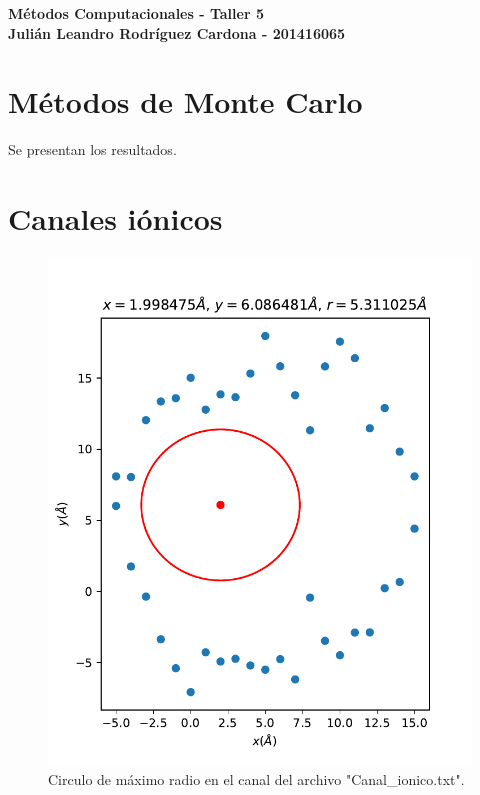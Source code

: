 \documentclass[12pt,letterpaper]{article}
\begin{document}
\begin{center}
{\Large \textbf{Métodos Computacionales - Taller 5}}\\
\vspace{0.3cm}
\textbf{Julián Leandro Rodríguez Cardona - 201416065}\\ \vspace{0.3cm}
\end{center}

\section*{Métodos de Monte Carlo}

Se presentan los resultados.

\section{Canales iónicos}

\begin{figure}[H]
\includegraphics{canal.pdf}
\caption{Circulo de máximo radio en el canal del archivo "Canal\_ionico.txt".}
\centering
\end{figure}
\end{document}
